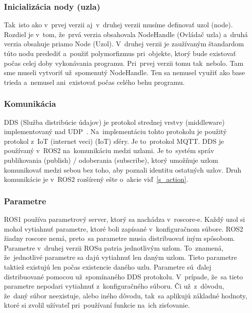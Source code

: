 \subsubsection{Inicializácia nody (uzla)}

	Tak~isto ako v~prvej verzii aj~v~druhej verzii musíme definovať uzol (node). Rozdiel je v~tom, že~prvá verzia obsahovala NodeHandle (Ovládač uzla)
	a~druhá verzia obsahuje priamo Node (Uzol). V~druhej verzii je zaužívaným štandardom túto nodu predediť a~použiť polymorfizmus pri~objekte,
	ktorý bude existovať počas celej doby vykonávania programu. Pri~prvej verzii tomu tak~nebolo. Tam sme museli vytvoriť už~spomenutý NodeHandle.
	Ten sa nemusel využiť ako base trieda a~nemusel ani~existovať počas celého behu programu.

\subsubsection{Komunikácia}

	DDS (Služba distribúcie údajov) je protokol strednej vrstvy (middleware) implementovaný nad UDP~\cite{ROS2book}. Na~implementáciu tohto protokolu
	je použitý protokol z~IoT (internet veci) (\acrlong{IoT}) sféry. Je to~protokol MQTT. DDS je používaný v~ROS2 na~komunikáciu medzi uzlami. Je
	to~systém správ publikovania (publish) / odoberania (subscribe), ktorý umožňuje uzlom komunikovať medzi sebou bez toho, aby poznali identitu
	ostatných uzlov. Druh komunikácie je v~ROS2 rozšírený ešte o~akcie viď~\ref{s_action}.

\subsubsection{Parametre}

	ROS1 používa parametrový server, ktorý sa nachádza v~roscore-e. Každý uzol si mohol vytiahnuť parametre, ktoré boli zapísané v~konfiguračnom
	súbore. ROS2 žiadny roscore nemá, preto~sa parametre musia distribuovať iným spôsobom. Parametre v~druhej verzii ROSu patria jednotlivým uzlom.
	To~znamená, že~jednotlivé parametre sa dajú vytiahnuť len daným uzlom. Tieto parametre taktiež existujú len počas existencie daného uzlu. Parametre
	sú~ďalej distribuované pomocou už~spomínaného DDS protokolu. V~prípade, že~sa tieto parametre nepodari vytiahnuť z~konfiguračného súboru. Či už~z~dôvodu,
	že~daný súbor neexistuje, alebo iného dôvodu, tak~sa aplikujú základné hodnoty, ktoré si zvolil užívateľ pri~používaní funkcie na~ich zisťovanie.

